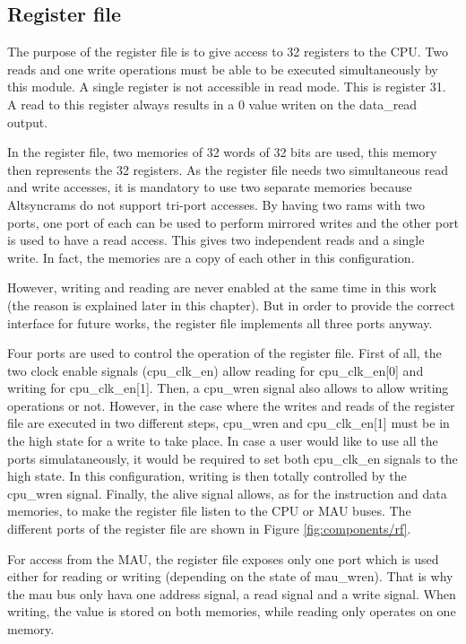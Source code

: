 \subsection{Register file}

The purpose of the register file is to give access to 32 registers to the CPU. Two reads and one 
write operations must be able to be executed simultaneously by this module. A single register is not 
accessible in read mode. This is register 31. A read to this register always results in a 0
value writen on the data\_read output.

In the register file, two memories of 32 words of 32 bits are used, this memory then represents 
the 32 registers. As the register file needs two simultaneous read and write accesses, it is
mandatory to use two separate memories because Altsyncrams do not support tri-port accesses.
By having two rams with two ports, one port of each can be used to perform mirrored writes and the 
other port is used to have a read access. This gives two independent reads and a single write. In 
fact, the memories are a copy of each other in this configuration. 

However, writing and reading are never enabled at the same time in this work (the reason is explained
later in this chapter). But 
in order to provide the correct interface for future works, the register file implements all three 
ports anyway. 

Four ports are used to control the operation of the register file. First of all, the 
two clock enable signals (cpu\_clk\_en) allow reading for cpu\_clk\_en[0] and writing for cpu\_clk\_en[1].  Then, 
a cpu\_wren signal also allows to allow writing operations or not. However, in the case where the writes and 
reads of the register file are executed in two different steps, cpu\_wren and cpu\_clk\_en[1] must be in the 
high state for a write to take place. In case a user would like to use all the ports simulataneously, 
it would be required to set both cpu\_clk\_en signals to the high state. In this configuration, writing 
is then totally controlled by the cpu\_wren signal. Finally, the alive signal allows, as for the instruction and 
data memories, to make the register file listen to the CPU or MAU buses. The different ports of the register file 
are shown in Figure \ref{fig:components/rf}.

For access from the MAU, the register file exposes only one port which is used either for 
reading or writing (depending on the state of mau\_wren). That is why the mau bus only hava one 
address signal, a read signal and a write signal. When writing, the value is stored on 
both memories, while reading only operates on one memory.

